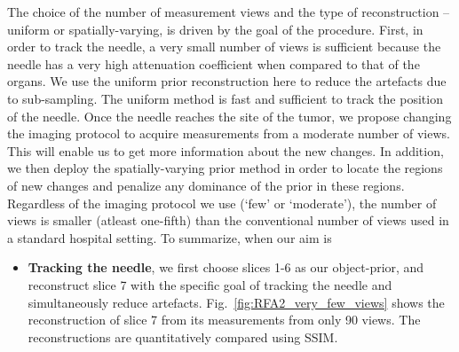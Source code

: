 \documentclass[journal]{IEEEtran}
\begin{document}
The choice of the number of
measurement views and the type of reconstruction -- uniform or
spatially-varying, is driven by the goal of the procedure. First, in
order to track the needle, a very small number of views is sufficient
because the needle has a very high attenuation coefficient when
compared to that of the organs. We use the uniform prior
reconstruction here to reduce the artefacts due to sub-sampling. The
uniform method is fast and sufficient to track the position of the
needle.  Once the needle reaches the site of the tumor, we propose
changing the imaging protocol to acquire measurements from a moderate
number of views. This will enable us to get more information about the
new changes. In addition, we then deploy the spatially-varying prior
method in order to locate the regions of new changes and penalize any
dominance of the prior in these regions.  Regardless of the imaging
protocol we use (`few' or `moderate'), the number of views is smaller
(atleast one-fifth) than the conventional number of views used in a
standard hospital setting. To summarize, when our aim is\\
\begin{itemize}
\item \textbf{Tracking the needle},  we first choose slices 1-6 as our
object-prior, and reconstruct slice 7 with the specific goal of
tracking the needle and simultaneously reduce
artefacts. Fig.~\ref{fig:RFA2_very_few_views} shows the reconstruction
of slice 7 from its measurements from only 90 views. The
reconstructions are quantitatively compared using SSIM.
\end{itemize}
\end{document}

